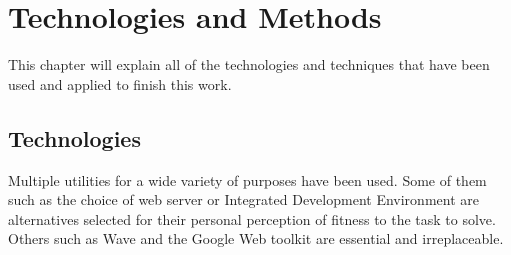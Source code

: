 \newpage
\thispagestyle{sectioned}
\chapter{Technologies and Methods}
This chapter will explain all of the technologies and techniques that have been used and applied to finish this work.
\section{Technologies}
Multiple utilities for a wide variety of purposes have been used. Some of them such as the choice of web server or Integrated Development Environment are alternatives selected for their personal perception of fitness to the task to solve. Others such as Wave and the Google Web toolkit are essential and irreplaceable.
